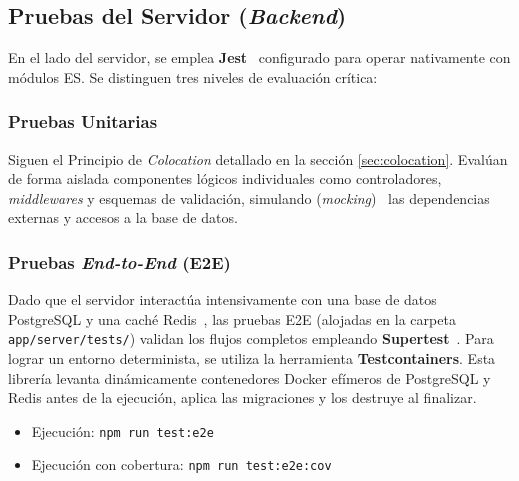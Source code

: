 \subsection{Pruebas del Servidor (\textit{Backend})}
En el lado del servidor, se emplea \textbf{Jest}~\cite{jest} configurado para operar nativamente con módulos ES. Se distinguen tres niveles de evaluación crítica:

\subsubsection{Pruebas Unitarias}
Siguen el Principio de \textit{Colocation} detallado en la sección \ref{sec:colocation}. Evalúan de forma aislada componentes lógicos individuales como controladores, \textit{middlewares} y esquemas de validación, simulando (\textit{mocking})~\cite{mocking} las dependencias externas y accesos a la base de datos.

\subsubsection{Pruebas \textit{End-to-End} (E2E)~\cite{e2e}}
Dado que el servidor interactúa intensivamente con una base de datos PostgreSQL y una caché Redis~\cite{redis}, las pruebas E2E (alojadas en la carpeta \texttt{app/server/tests/}) validan los flujos completos empleando \textbf{Supertest}~\cite{supertest}.
Para lograr un entorno determinista, se utiliza la herramienta \textbf{Testcontainers}. Esta librería levanta dinámicamente contenedores Docker efímeros de PostgreSQL y Redis antes de la ejecución, aplica las migraciones y los destruye al finalizar.
\begin{itemize}
    \item Ejecución: \texttt{npm run test:e2e}
    \item Ejecución con cobertura: \texttt{npm run test:e2e:cov}
\end{itemize}

